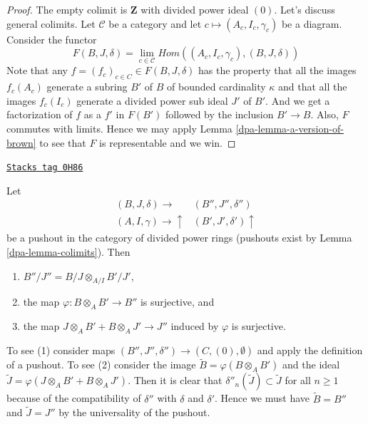 \begin{proof}

The empty colimit is $\mathbf{Z}$ with divided power ideal $(0)$.
Let's discuss general colimits. Let $\mathcal{C}$ be a category and let
$c \mapsto (A_c, I_c, \gamma_c)$ be a diagram. Consider the functor
$$
F(B, J, \delta) = \lim_{c \in \mathcal{C}}
Hom((A_c, I_c, \gamma_c), (B, J, \delta))
$$
Note that any $f = (f_c)_{c \in C} \in F(B, J, \delta)$ has the property
that all the images $f_c(A_c)$ generate a subring $B'$ of $B$ of bounded
cardinality $\kappa$ and that all the images $f_c(I_c)$ generate a
divided power sub ideal $J'$ of $B'$. And we get a factorization of
$f$ as a $f'$ in $F(B')$ followed by the inclusion $B' \to B$. Also,
$F$ commutes with limits. Hence we may apply
Lemma \ref{dpa-lemma-a-version-of-brown}
to see that $F$ is representable and we win.
\end{proof}

\begin{remark}[Pushout]
\label{dpa-remark-pushout}
\href{https://stacks.math.columbia.edu/tag/0H86}{\texttt{Stacks tag 0H86}}

Let
$$
\begin{array}{cc}(B, J, \delta) \longrightarrow & (B'', J'', \delta'') \\ (A, I, \gamma) \longrightarrow\uparrow & (B', J', \delta') \uparrow\end{array}
$$
be a pushout in the category of divided power rings (pushouts exist
by Lemma \ref{dpa-lemma-colimits}). Then
\begin{enumerate}
\item $B''/J'' = B/J \otimes_{A/I} B'/J'$,
\item the map $\varphi : B \otimes_A B' \to B''$ is surjective, and
\item the map $J \otimes_A B' + B \otimes_A J' \to J''$ induced by $\varphi$
is surjective.
\end{enumerate}
To see (1) consider maps $(B'', J'', \delta'') \to (C, (0), \emptyset)$
and apply the definition of a pushout. To see (2) consider the
image $\tilde B = \varphi(B \otimes_A B')$ and the ideal
$\tilde J = \varphi(J \otimes_A B' + B \otimes_A J')$. Then it is
clear that $\delta''_n(\tilde J) \subset \tilde J$ for all $n \geq 1$
because of the compatibility of $\delta''$ with $\delta$ and $\delta'$.
Hence we must have $\tilde B = B''$ and $\tilde J = J''$ by the universality
of the pushout.
\end{remark}

